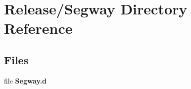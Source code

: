 \section{Release/\+Segway Directory Reference}
\label{dir_636834615c2cc9dd5db8accdebbd344d}
\subsection*{Files}
\begin{DoxyCompactItemize}
\item 
file {\bfseries Segway.\+d}
\end{DoxyCompactItemize}
